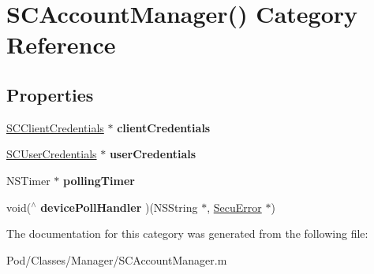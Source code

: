 \hypertarget{category_s_c_account_manager_07_08}{}\section{S\+C\+Account\+Manager() Category Reference}
\label{category_s_c_account_manager_07_08}
\subsection*{Properties}
\begin{DoxyCompactItemize}
\item 
\hyperlink{interface_s_c_client_credentials}{S\+C\+Client\+Credentials} $\ast$ {\bfseries client\+Credentials}\hypertarget{category_s_c_account_manager_07_08_aafa059fe7aa1cac1f07c8ed9d9cf78c1}{}\label{category_s_c_account_manager_07_08_aafa059fe7aa1cac1f07c8ed9d9cf78c1}

\item 
\hyperlink{interface_s_c_user_credentials}{S\+C\+User\+Credentials} $\ast$ {\bfseries user\+Credentials}\hypertarget{category_s_c_account_manager_07_08_a10941be1e5bcbb8ce76ca07e6a1d8ead}{}\label{category_s_c_account_manager_07_08_a10941be1e5bcbb8ce76ca07e6a1d8ead}

\item 
N\+S\+Timer $\ast$ {\bfseries polling\+Timer}\hypertarget{category_s_c_account_manager_07_08_a7b33b3d8c0adc92ff71d86cf79269075}{}\label{category_s_c_account_manager_07_08_a7b33b3d8c0adc92ff71d86cf79269075}

\item 
void($^\wedge$ {\bfseries device\+Poll\+Handler} )(N\+S\+String $\ast$, \hyperlink{interface_secu_error}{Secu\+Error} $\ast$)\hypertarget{category_s_c_account_manager_07_08_a78597ea167f228499d054b6770bea9cc}{}\label{category_s_c_account_manager_07_08_a78597ea167f228499d054b6770bea9cc}

\end{DoxyCompactItemize}


The documentation for this category was generated from the following file\+:\begin{DoxyCompactItemize}
\item 
Pod/\+Classes/\+Manager/S\+C\+Account\+Manager.\+m\end{DoxyCompactItemize}
